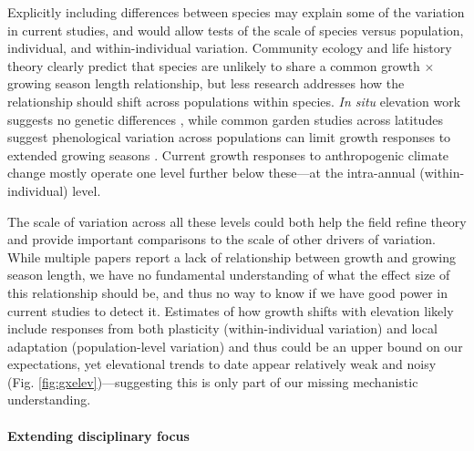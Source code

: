 \documentclass[11pt]{article}
\begin{document}
Explicitly including differences between species may explain some of the variation in current studies, and would allow tests of the scale of species versus population, individual, and within-individual variation. Community ecology and life history theory clearly predict that species are unlikely to share a common growth $\times$ growing season length relationship, but less research addresses how the relationship should shift across populations within species. \emph{In situ} elevation work suggests no genetic differences \citep{king2013tree}, while common garden studies across latitudes suggest phenological variation across populations can limit growth responses to extended growing seasons \citep{soolanayakanahally2013timing}. Current growth responses to anthropogenic climate change mostly operate one level further below these---at the intra-annual (within-individual) level. 


The scale of variation across all these levels could both help the field refine theory and provide important comparisons to the scale of other drivers of variation. While multiple papers report a lack of relationship between growth and growing season length, we have no fundamental understanding of what the effect size of this relationship should be, and thus no way to know if we have good power in current studies to detect it. Estimates of how growth shifts with elevation likely include responses from both plasticity (within-individual variation) and local adaptation (population-level variation) and thus could be an upper bound on our expectations, yet elevational trends to date appear relatively weak and noisy (Fig. \ref{fig:gxelev})---suggesting this is only part of our missing mechanistic understanding. 

\paragraph{Extending disciplinary focus} 
\end{document}
